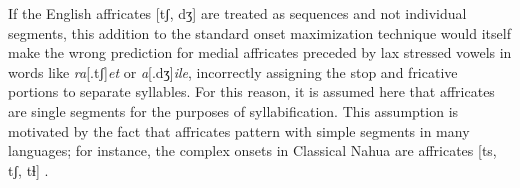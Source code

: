 If the English affricates [tʃ, dʒ] are treated as sequences and not individual segments, this addition to the standard onset maximization technique would itself make the wrong prediction for medial affricates preceded by lax stressed vowels in words like \emph{ra}[.tʃ]\emph{et} or \emph{a}[.dʒ]\emph{ile}, incorrectly assigning the stop and fricative portions to separate syllables. For this reason, it is assumed here that affricates are single segments for the purposes of syllabification. This assumption is motivated by the fact that affricates pattern with simple segments in many languages; for instance, the complex onsets in Classical Nahua are affricates [ts, tʃ, tɬ] \citep[][9]{Launey2011}.

